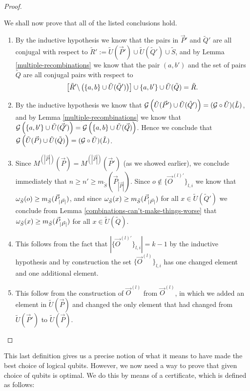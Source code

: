 \documentclass[twocolumn,showpacs,preprintnumbers,amsmath,amssymb,nofootinbib,pra,floatfix]{revtex4-1}
\newcommand{\lst}{\vec}
\newcommand{\set}{\tilde}
\newcommand{\genfun}{\mathcal{G}}
\begin{document}
\begin{proof}
\begin{description}
We shall now prove that all of the listed conclusions hold.
\begin{enumerate}
\item By the inductive hypothesis we know that the pairs in $\lst P'$ and $\set Q'$ are all conjugal with respect to $\set R' := \set U(\lst P')\cup \set U(\set Q')\cup \set S$, and by Lemma \ref{multiple-recombinations} we know that the pair $(a,b')$ and the set of pairs $\set Q$ are all conjugal pairs with respect to
$$\left[\set R'\backslash\paren{\{a,b\} \cup \set U(\set Q')}\right]\cup \{a,b'\} \cup \set U(\set Q)=\set R.$$
\item By the inductive hypothesis we know that $\genfun\paren{\set U(\lst P')\cup \set U(\set Q')}=(\genfun\circ\set U)(\set L)$, and by Lemma \ref{multiple-recombinations} we know that $\genfun\paren{\{a,b'\}\cup \set U(\lst Q')}=\genfun\paren{\{a,b\}\cup \set U(\lst Q)}$.  Hence we conclude that $\genfun\paren{\set U(\lst P)\cup \set U(\set Q)}=(\genfun\circ\set U)(\set L)$.
\item Since $M^{(|\lst P|)}(\lst P)=M^{(|\lst P|)}(\lst P')$ (as we showed earlier), we conclude immediately that $n \ge n' \ge m_{\set S}(\lst P_{|\lst P|})$.  Since $o\notin \{\lst O^{(l)'}\}_{l,i}$ we know that $\om_{\set S}(o)\ge m_{\set S}(\lst P_{|\lst P|})$, and since $\om_{\set S}(x)\ge m_{\set S}(\lst P_{|\lst P|})$ for all $x\in\set U(\set Q')$ we conclude from Lemma \ref{combinations-can't-make-things-worse} that $\om_{\set S}(x)\ge m_{\set S}(\lst P_{|\lst P|})$ for all $x\in\set U(\set Q)$.
\item This follows from the fact that $\left|\{\lst O^{(l)'}\}_{l,i}\right| = k-1$ by the inductive hypothesis and by construction the set $\{\lst O^{(l)}\}_{l,i}$ has one changed element and one additional element.
\item This follow from the construction of $\lst O^{(l)}$ from $\lst O^{(l)}$, in which we added an element in $\set U(\lst P)$ and changed the only element that had changed from $\set U(\lst P')$ to $\set U(\lst P)$.
\end{enumerate}
\end{description}

\end{proof}
This last definition gives us a precise notion of what it means to have made the best choice of logical qubits.  However, we now need a way to prove that given choice of qubits is optimal.  We do this by means of a certificate, which is defined as follows:
\end{document}

